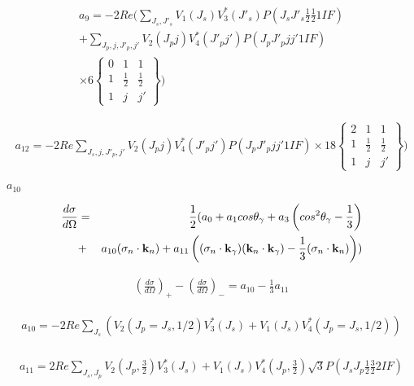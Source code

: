 \documentclass[11pt,a4paper]{jsarticle}
\begin{document}
\begin{eqnarray}
 a_9=
 -2Re(\sum_{J_s,J'_s} V_1(J_s)V^*_3(J'_s)P(J_sJ'_s \frac12 \frac12 1 I F) \nonumber \\
 +\sum_{J_p,j,J'_p,j'} V_2(J_pj)V^*_4(J'_pj')P(J_pJ'_p j j' 1 I F)  \nonumber \\
\times 6 \left\{
\begin{array}{ccc}
0&1&1\\
1&\frac12&\frac12\\
1&j&j'
\end{array}
\right\}
 )
  \end{eqnarray}

\begin{eqnarray}
 a_{12}=
 -2Re\sum_{J_s,j,J'_p,j'} V_2(J_pj)V^*_4(J'_pj')P(J_pJ'_p j j' 1 I F) 
\times 18 \left\{
\begin{array}{ccc}
2&1&1\\
1&\frac12&\frac12\\
1&j&j'
\end{array}
\right\}
 )
  \end{eqnarray}

$a_{10}$

\begin{eqnarray}
\frac{d\sigma}{d\Omega} &=& \frac{1}{2}  ( a_0+ a_1 cos \theta_\gamma + a_3\left(cos^2 \theta_\gamma -\frac{1}{3} \right)  \nonumber \\ 
&+&a_{10}({\bf \sigma}_n \cdot {\bf k}_n) + a_{11}\left(({\bf \sigma}_n \cdot {\bf k}_\gamma)({\bf k}_n \cdot {\bf k}_\gamma) -\frac{1}{3}({\bf \sigma}_n \cdot {\bf k}_n) \right)
)
\end{eqnarray}

\begin{eqnarray}
\left(\frac{d\sigma}{d\Omega}\right)_+ - \left(\frac{d\sigma}{d\Omega}\right)_-
=a_{10}-\frac13a_{11}
\nonumber
\end{eqnarray}


\begin{eqnarray}
 a_{10}=
 -2Re\sum_{J_s} \left(V_2(J_p=J_s,1/2)V^*_3(J_s)
 +V_1(J_s)V^*_4(J_p=J_s,1/2) \right) \nonumber \\
  \end{eqnarray}

\begin{eqnarray}
 a_{11}=
 2Re\sum_{J_s,J_p} V_2(J_p,\frac32)V^*_3(J_s) +V_1(J_s)V^*_4(J_p,\frac32) \sqrt{3}P(J_sJ_p \frac12 \frac32 2 I F) 
  \end{eqnarray}

\end{document}
